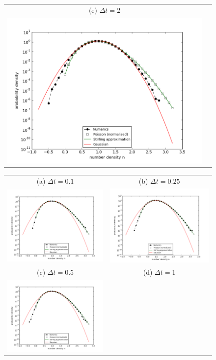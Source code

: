 \documentclass{article}
\begin{document}
\begin{figure}
\begin{tabular}{cc}
(e) $\Delta t=2$ & \\
\includegraphics[width=0.5\linewidth]{fig1/2d_DIFF_dt2_hist.png} &
\end{tabular}
\caption{\label{fig_2d_DIFF_hist}}
\end{figure}

\begin{figure}
\begin{center}
\end{center}
\begin{tabular}{cc}
(a) $\Delta t=0.1$ & (b) $\Delta t=0.25$ \\
\includegraphics[width=0.5\linewidth]{fig1/2d_REACT_dt0.1_hist.png} &
\includegraphics[width=0.5\linewidth]{fig1/2d_REACT_dt0.25_hist.png} \\
(c) $\Delta t=0.5$ & (d) $\Delta t=1$ \\
\includegraphics[width=0.5\linewidth]{fig1/2d_REACT_dt0.5_hist.png} &

\end{tabular}
\end{figure}
\end{document}
